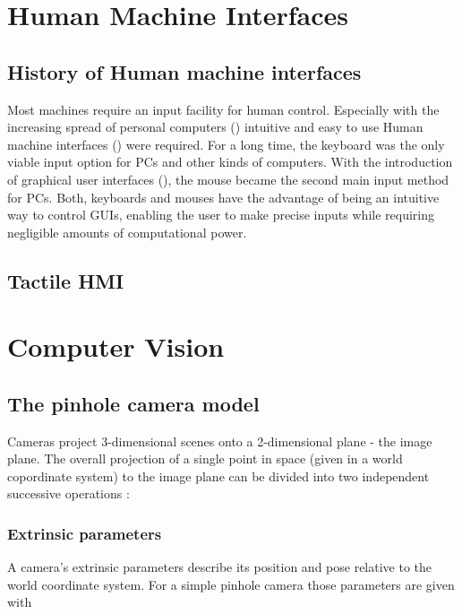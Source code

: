 \section{Human Machine Interfaces}
	\subsection{History of Human machine interfaces}
Most machines require an input facility for human control. Especially with the increasing spread of personal computers () intuitive and easy to use Human machine interfaces () were required. For a long time, the keyboard was the only viable input option for PCs and other kinds of computers. With the introduction of graphical user interfaces (), the mouse became the second main input method for PCs. Both, keyboards and mouses have the advantage of being an intuitive way to control GUIs, enabling the user to make precise inputs while requiring negligible amounts of computational power. 





	\subsection{Tactile HMI}

\section { Computer Vision }
	\subsection { The pinhole camera model }
		Cameras project 3-dimensional scenes onto a 2-dimensional plane - the image plane.
		The overall projection of a single point in space (given in a world copordinate system) to the image plane can be divided into two independent successive operations \cite[S.~50]{Szeliski2010}:
		
		\subsubsection{Extrinsic parameters}
			A camera's extrinsic parameters describe its position and pose relative to the world coordinate system. For a simple pinhole camera those parameters are given with 
			
